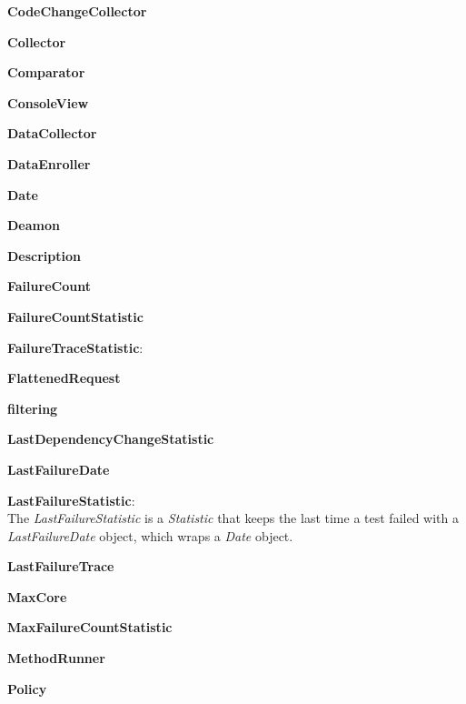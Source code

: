 \documentclass[i2]{oss}
\newcommand{\class}[1]{\emph{#1}}
\newcommand{\gloss}[1]{\textbf{#1}}
\begin{document}
\begin{description}
\item \gloss{CodeChangeCollector}

\item \gloss{Collector}

\item \gloss{Comparator}

\item \gloss{ConsoleView}

\item \gloss{DataCollector}

\item \gloss{DataEnroller}

\item \gloss{Date}

\item \gloss{Deamon}

\item \gloss{Description}

\item \gloss{FailureCount}

\item \gloss{FailureCountStatistic}

\item \gloss{FailureTraceStatistic}: 
	

\item \gloss{FlattenedRequest}

\item \gloss{filtering}

\item \gloss{LastDependencyChangeStatistic}

\item \gloss{LastFailureDate}

\item \gloss{LastFailureStatistic}: \\
 The \class{LastFailureStatistic} is a \class{Statistic} that keeps the last time a test failed with a \class{LastFailureDate} object, which wraps a \class{Date} object.

\item \gloss{LastFailureTrace}

\item \gloss{MaxCore}

\item \gloss{MaxFailureCountStatistic}

\item \gloss{MethodRunner}

\item \gloss{Policy}


\end{description}
\end{document}
